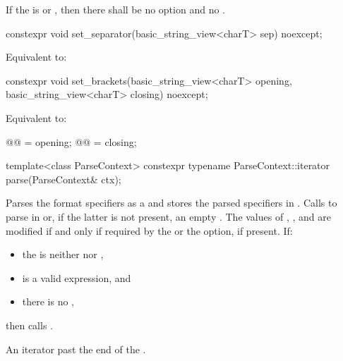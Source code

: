 If the  is  or ,
then there shall be
no  option and no .

%
\begin{itemdecl}
constexpr void set_separator(basic_string_view<charT> sep) noexcept;
\end{itemdecl}

\begin{itemdescr}
\pnum
\effects
Equivalent to: 
\end{itemdescr}

%
\begin{itemdecl}
constexpr void set_brackets(basic_string_view<charT> opening,
                            basic_string_view<charT> closing) noexcept;
\end{itemdecl}

\begin{itemdescr}
\pnum
\effects
Equivalent to:
\begin{codeblock}
@@ = opening;
@@ = closing;
\end{codeblock}
\end{itemdescr}

%
\begin{itemdecl}
template<class ParseContext>
  constexpr typename ParseContext::iterator
    parse(ParseContext& ctx);
\end{itemdecl}

\begin{itemdescr}
\pnum
\effects
Parses the format specifiers as a  and
stores the parsed specifiers in .
Calls  to parse
 in  or,
if the latter is not present, an empty .
The values of
, , and 
are modified if and only if required by
the  or the  option, if present.
If:
\begin{itemize}
\item
the  is neither  nor ,
\item
{} is a valid expression, and
\item
there is no ,
\end{itemize}
then calls .

\pnum
\returns
An iterator past the end of the .
\end{itemdescr}

